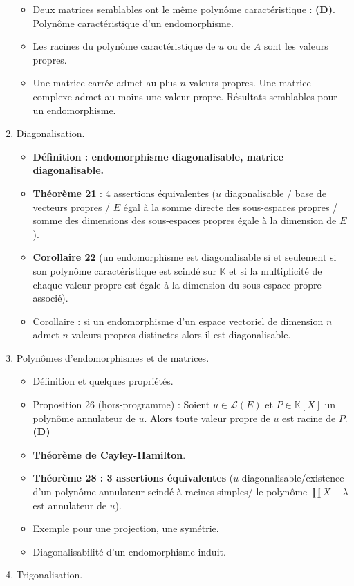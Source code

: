 \documentclass[twoside,a4paper,french,10pt]{VcCours}
\begin{document}
\begin{enumerate}
\begin{itemize}
\item Deux matrices semblables ont le même polynôme caractéristique : \textbf{(D)}. Polynôme caractéristique d'un endomorphisme.
\item Les racines du polynôme caractéristique de $u$ ou de $A$ sont les valeurs propres. 
\item Une matrice carrée admet au plus $n$ valeurs propres. Une matrice complexe admet au moins une valeur propre. Résultats semblables pour un endomorphisme. 
\end{itemize}
\item Diagonalisation.
\begin{itemize}
\item \textbf{Définition : endomorphisme diagonalisable, matrice diagonalisable.}
\item \textbf{Théorème 21} : 4 assertions équivalentes ($u$ diagonalisable / base de vecteurs propres / $E$ égal à la somme directe des sous-espaces propres / somme des dimensions des sous-espaces propres égale à la dimension de $E$).
\item \textbf{Corollaire 22} (un endomorphisme est diagonalisable si et seulement si son polynôme caractéristique est scindé sur $\mathbb{K}$ et si la multiplicité de chaque valeur propre est égale à la dimension du sous-espace propre associé).
\item Corollaire : si un endomorphisme d'un espace vectoriel de dimension $n$ admet $n$ valeurs propres distinctes alors il est diagonalisable.
\end{itemize}
\item Polynômes d'endomorphismes et de matrices.
\begin{itemize}
\item Définition et quelques propriétés.
\item Proposition 26 (hors-programme) : Soient $u \in \mathcal{L}(E)$ et $P \in \mathbb{K}[X]$ un polynôme annulateur de $u$. Alors toute valeur propre de $u$ est racine de $P$. \textbf{(D)}
\item \textbf{Théorème de Cayley-Hamilton}.
\item \textbf{Théorème 28 : 3 assertions équivalentes} ($u$ diagonalisable/existence d'un polynôme annulateur scindé à racines simples/ le polynôme $\prod X- \lambda$ est annulateur de $u$).
\item Exemple pour une projection, une symétrie.
\item Diagonalisabilité d'un endomorphisme induit.
\end{itemize}
\item Trigonalisation.

\end{enumerate}
\end{document}
